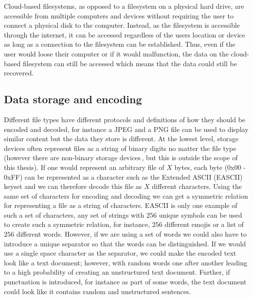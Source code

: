Cloud-based filesystems, as opposed to a filesystem on a physical hard drive, are accessible from multiple computers and devices without requiring the user to connect a physical disk to the computer. Instead, as the filesystem is accessible through the internet, it can be accessed regardless of the users location or device as long as a connection to the filesystem can be established. Thus, even if the user would loose their computer or if it would malfunction, the data on the cloud-based filesystem can still be accessed which means that the data could still be recovered.


\subsection{Data storage and encoding}
\label{sec:data_storage}
Different file types have different protocols and definitions of how they should be encoded and decoded, for instance a JPEG and a PNG file can be used to display similar content but the data they store is different. At the lowest level, storage devices often represent files as a string of binary digits no matter the file type (however there are non-binary storage devices\,\cite{MultistateDataStorage2020}, but this is outside the scope of this thesis). If one would represent an arbitrary file of $X$ bytes, each byte (0x00 - 0xFF) can be represented as a character such as the Extended ASCII (EASCII) keyset and we can therefore decode this file as $X$ different characters. Using the same set of characters for encoding and decoding we can get a symmetric relation for representing a file as a string of characters. EASCII is only one example of such a set of characters, any set of strings with $256$ unique symbols can be used to create such a symmetric relation, for instance, $256$ different emojis or a list of $256$ different words. However, if we are using a set of words we could also have to introduce a unique separator so that the words can be distinguished. If we would use a single space character as the separator, we could make the encoded text look like a text document; however, with random words one after another leading to a high probability of creating an unstructured text document. Further, if punctuation is introduced, for instance as part of some words, the text document could look like it contains random and unstructured sentences.


